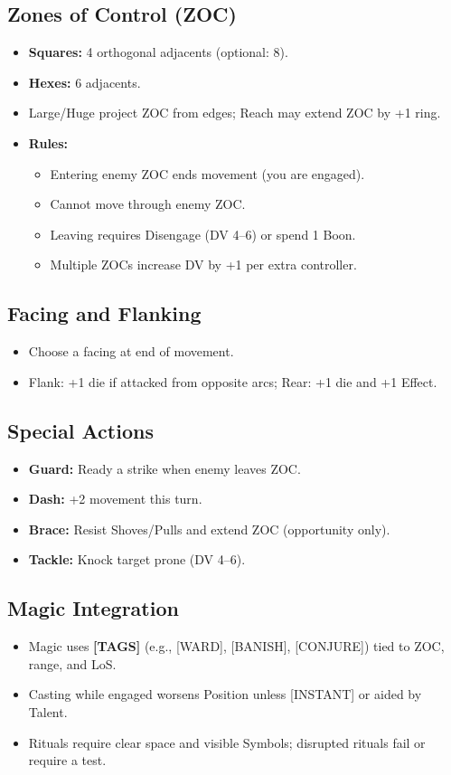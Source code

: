 \subsection{Zones of Control (ZOC)}
\begin{itemize}
  \item \textbf{Squares:} 4 orthogonal adjacents (optional: 8). 
  \item \textbf{Hexes:} 6 adjacents.
  \item Large/Huge project ZOC from edges; Reach may extend ZOC by +1 ring.
  \item \textbf{Rules:} 
    \begin{itemize}
      \item Entering enemy ZOC ends movement (you are engaged).
      \item Cannot move through enemy ZOC.
      \item Leaving requires Disengage (DV 4–6) or spend 1 Boon.
      \item Multiple ZOCs increase DV by +1 per extra controller.
    \end{itemize}
\end{itemize}

\subsection{Facing and Flanking}
\begin{itemize}
  \item Choose a facing at end of movement.
  \item Flank: +1 die if attacked from opposite arcs; Rear: +1 die and +1 Effect.
\end{itemize}

\subsection{Special Actions}
\begin{itemize}
  \item \textbf{Guard:} Ready a strike when enemy leaves ZOC.
  \item \textbf{Dash:} +2 movement this turn.
  \item \textbf{Brace:} Resist Shoves/Pulls and extend ZOC (opportunity only).
  \item \textbf{Tackle:} Knock target prone (DV 4–6).
\end{itemize}

\subsection{Magic Integration}
\begin{itemize}
  \item Magic uses \textbf{[TAGS]} (e.g., [WARD], [BANISH], [CONJURE]) tied to ZOC, range, and LoS.
  \item Casting while engaged worsens Position unless [INSTANT] or aided by Talent.
  \item Rituals require clear space and visible Symbols; disrupted rituals fail or require a test.
\end{itemize}

